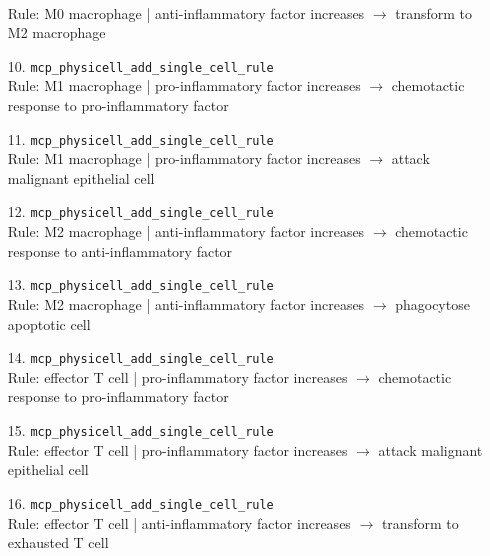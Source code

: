 \begin{enumerate}
\hfill\\
\RaggedRight Rule: M0 macrophage | anti-inflammatory factor increases \ensuremath{\rightarrow} transform to M2 macrophage
\item[10.] \texttt{mcp\_\allowbreak{}physicell\_\allowbreak{}add\_\allowbreak{}single\_\allowbreak{}cell\_\allowbreak{}rule}
\hfill\\
\RaggedRight Rule: M1 macrophage | pro-inflammatory factor increases \ensuremath{\rightarrow} chemotactic response to pro-inflammatory factor
\item[11.] \texttt{mcp\_\allowbreak{}physicell\_\allowbreak{}add\_\allowbreak{}single\_\allowbreak{}cell\_\allowbreak{}rule}
\hfill\\
\RaggedRight Rule: M1 macrophage | pro-inflammatory factor increases \ensuremath{\rightarrow} attack malignant epithelial cell
\item[12.] \texttt{mcp\_\allowbreak{}physicell\_\allowbreak{}add\_\allowbreak{}single\_\allowbreak{}cell\_\allowbreak{}rule}
\hfill\\
\RaggedRight Rule: M2 macrophage | anti-inflammatory factor increases \ensuremath{\rightarrow} chemotactic response to anti-inflammatory factor
\item[13.] \texttt{mcp\_\allowbreak{}physicell\_\allowbreak{}add\_\allowbreak{}single\_\allowbreak{}cell\_\allowbreak{}rule}
\hfill\\
\RaggedRight Rule: M2 macrophage | anti-inflammatory factor increases \ensuremath{\rightarrow} phagocytose apoptotic cell
\item[14.] \texttt{mcp\_\allowbreak{}physicell\_\allowbreak{}add\_\allowbreak{}single\_\allowbreak{}cell\_\allowbreak{}rule}
\hfill\\
\RaggedRight Rule: effector T cell | pro-inflammatory factor increases \ensuremath{\rightarrow} chemotactic response to pro-inflammatory factor
\item[15.] \texttt{mcp\_\allowbreak{}physicell\_\allowbreak{}add\_\allowbreak{}single\_\allowbreak{}cell\_\allowbreak{}rule}
\hfill\\
\RaggedRight Rule: effector T cell | pro-inflammatory factor increases \ensuremath{\rightarrow} attack malignant epithelial cell
\item[16.] \texttt{mcp\_\allowbreak{}physicell\_\allowbreak{}add\_\allowbreak{}single\_\allowbreak{}cell\_\allowbreak{}rule}
\hfill\\
\RaggedRight Rule: effector T cell | anti-inflammatory factor increases \ensuremath{\rightarrow} transform to exhausted T cell

\end{enumerate}

